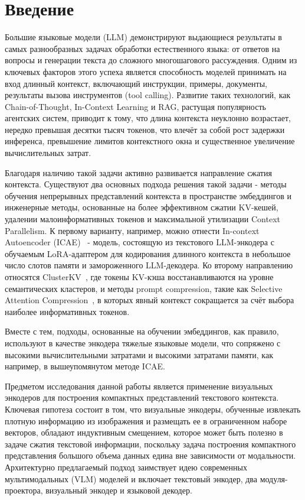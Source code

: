 \documentclass[a4paper,12pt]{extarticle}
\begin{document}
\section{Введение} 

Большие языковые модели (LLM) демонстрируют выдающиеся результаты в самых разнообразных задачах обработки естественного языка: от ответов на вопросы и генерации текста до сложного многошагового рассуждения. Одним из ключевых факторов этого успеха является способность моделей принимать на вход длинный контекст, включающий инструкции, примеры, документы, результаты вызова инструментов (tool calling). Развитие таких технологий, как Chain-of-Thought, In-Context Learning и RAG, растущая популярность агентских систем, приводит к тому, что длина контекста неуклонно возрастает, нередко превышая десятки тысяч токенов, что влечёт за собой рост задержки инференса, превышение лимитов контекстного окна и существенное увеличение вычислительных затрат.

Благодаря наличию такой задачи активно развивается направление сжатия контекста. Существуют два основных подхода решения такой задачи - методы обучения непрерывных представлений контекста в пространстве эмбеддингов и инженерные методы, основанные на более эффективном сжатии KV-кешей, удалении малоинформативных токенов и максимальной утилизации Context Parallelism. К первому варианту, например, можно отнести In-context Autoencoder (ICAE)~\cite{icae} - модель, состоящую из текстового LLM-энкодера с обучаемым LoRA-адаптером для кодирования длинного контекста в небольшое число слотов памяти и замороженного LLM-декодера. Ко второму направлению относятся ClusterKV~\cite{cluster_kv}, где токены KV-кэша восстанавливаются на уровне семантических кластеров, и методы prompt compression, такие как Selective Attention Compression~\cite{sac}, в которых явный контекст сокращается за счёт выбора наиболее информативных токенов.

Вместе с тем, подходы, основанные на обучении эмбеддингов, как правило, используют в качестве энкодера тяжелые языковые модели, что сопряжено с высокими вычислительными затратами и высокими затратами памяти, как например, в вышеупомянутом методе ICAE.

Предметом исследования данной работы является применение визуальных энкодеров для построения компактных представлений текстового контекста. Ключевая гипотеза состоит в том, что визуальные энкодеры, обученные извлекать плотную информацию из изображения и размещать ее в ограниченном наборе векторов, обладают индуктивным смещением, которое может быть полезно в задаче сжатия текстовой информации, поскольку задача построения компактного представления большого объема данных едина вне зависимости от модальности. Архитектурно предлагаемый подход заимствует идею современных мультимодальных (VLM) моделей и включает текстовый энкодер, два модуля-проектора, визуальный энкодер и языковой декодер.
\end{document}
